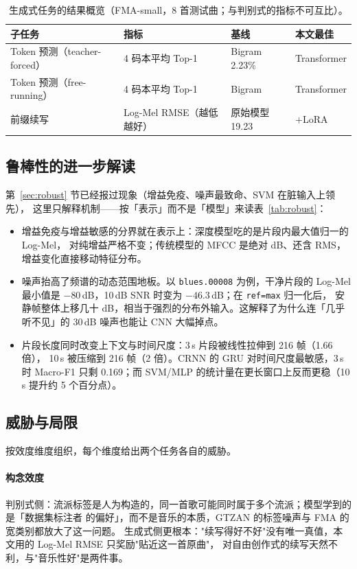 \documentclass[UTF8,10pt,a4paper]{ctexart}
\begin{document}
\begin{table}[H]
\centering\small
\caption{生成式任务的结果概览（FMA-small，8 首测试曲；与判别式的指标不可互比）。}
\label{tab:difficulty-gen}
\begin{tabular}{llll}
\toprule
子任务 & 指标 & 基线 & 本文最佳\\
\midrule
Token 预测（teacher-forced） & 4 码本平均 Top-1 & Bigram 2.23\% & Transformer \TokTfTeacher{}\\
Token 预测（free-running） & 4 码本平均 Top-1 & Bigram \TokBigramFree{} & Transformer \TokTransformerFree{}\\
前缀续写 & Log-Mel RMSE（越低越好） & 原始模型 19.23 & $+$LoRA \GenFtRmse{}\\
\bottomrule
\end{tabular}
\end{table}

\subsection{鲁棒性的进一步解读}

第~\ref{sec:robust} 节已经报过现象（增益免疫、噪声最致命、SVM 在脏输入上领先），
这里只解释机制——按「表示」而不是「模型」来读表~\ref{tab:robust}：
\begin{itemize}
  \item 增益免疫与增益敏感的分界就在表示上：深度模型吃的是片段内最大值归一的 Log-Mel，
  对纯增益严格不变；传统模型的 MFCC 是绝对 dB、还含 RMS，增益变化直接移动特征分布。
  \item 噪声抬高了频谱的动态范围地板。以 \texttt{blues.00008} 为例，干净片段的 Log-Mel
  最小值是 $-80$\,dB，10\,dB SNR 时变为 $-46.3$\,dB；在 \texttt{ref=max} 归一化后，
  安静帧整体上移几十 dB，相当于强烈的分布外输入。这解释了为什么连「几乎听不见」的
  30\,dB 噪声也能让 CNN 大幅掉点。
  \item 片段长度同时改变上下文与时间尺度：3\,s 片段被线性拉伸到 216 帧（1.66 倍），
  10\,s 被压缩到 216 帧（2 倍）。CRNN 的 GRU 对时间尺度最敏感，3\,s 时 Macro-F1 只剩
  0.169；而 SVM/MLP 的统计量在更长窗口上反而更稳（10\,s 提升约 5 个百分点）。
\end{itemize}

\subsection{威胁与局限}\label{sec:limits}

按效度维度组织，每个维度给出两个任务各自的威胁。

\paragraph{构念效度}
判别式侧：流派标签是人为构造的，同一首歌可能同时属于多个流派；模型学到的是「数据集标注者
的偏好」，而不是音乐的本质，GTZAN 的标签噪声与 FMA 的宽类别都放大了这一问题。
生成式侧更根本："续写得好不好"没有唯一真值，本文用的 Log-Mel RMSE 只奖励"贴近这一首原曲"，
对自由创作式的续写天然不利，与"音乐性好"是两件事。
\end{document}
